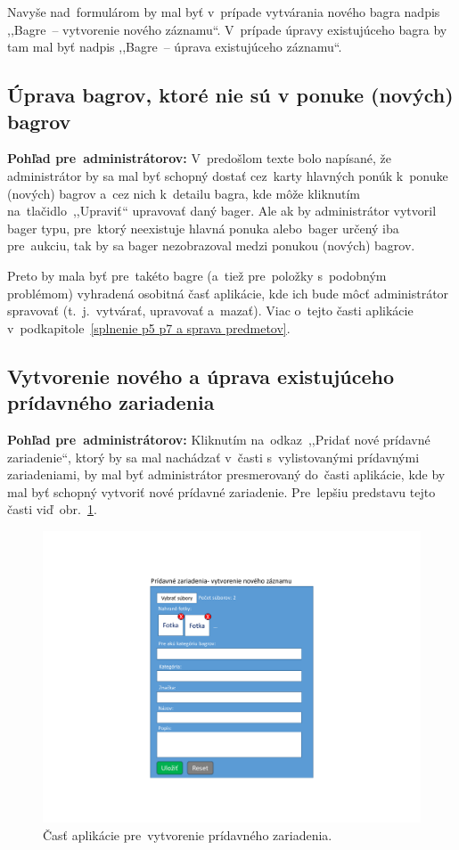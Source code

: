 Navyše nad~formulárom by mal byť v~prípade vytvárania nového bagra nadpis ,,Bagre~-- vytvorenie nového záznamu``. V~prípade úpravy existujúceho bagra by tam mal byť nadpis ,,Bagre~-- úprava existujúceho záznamu``.

\subsection{Úprava bagrov, ktoré nie sú v ponuke (nových) bagrov}

\textbf{Pohľad pre~administrátorov:} V~predošlom texte bolo napísané, že administrátor by sa mal byť schopný dostať cez~karty hlavných ponúk k~ponuke (nových) bagrov a~cez nich k~detailu bagra, kde môže kliknutím na~tlačidlo~,,Upraviť`` upravovať daný bager. Ale ak by administrátor vytvoril bager typu, pre~ktorý neexistuje hlavná ponuka alebo~bager určený iba pre~aukciu, tak by sa bager nezobrazoval medzi ponukou (nových) bagrov.

Preto by mala byť pre~takéto bagre (a~tiež pre~položky s~podobným problémom) vyhradená osobitná časť aplikácie, kde ich bude môcť administrátor spravovať (t.~j.~vytvárať, upravovať a~mazať). Viac o~tejto časti aplikácie v~podkapitole~\ref{splnenie p5 p7 a sprava predmetov}.

\subsection{Vytvorenie nového a úprava existujúceho prídavného zariadenia}
\label{vytvorenie noveho a uprava existujuceho pridavného zariadenia}

\textbf{Pohľad pre~administrátorov:} Kliknutím na~odkaz~,,Pridať nové prídavné zariadenie``, ktorý by sa mal nachádzať v~časti s~vylistovanými prídavnými zariadeniami, by mal byť administrátor presmerovaný do~časti aplikácie, kde by mal byť schopný vytvoriť nové prídavné zariadenie. Pre~lepšiu predstavu tejto časti viď~obr.~\ref{additional equipment form}.

\begin{figure}[H]\centering
\includegraphics[width=140mm]{../img/UI concept/additional equipment form}
\caption{Časť aplikácie pre~vytvorenie prídavného zariadenia.}
\label{additional equipment form}
\end{figure}

